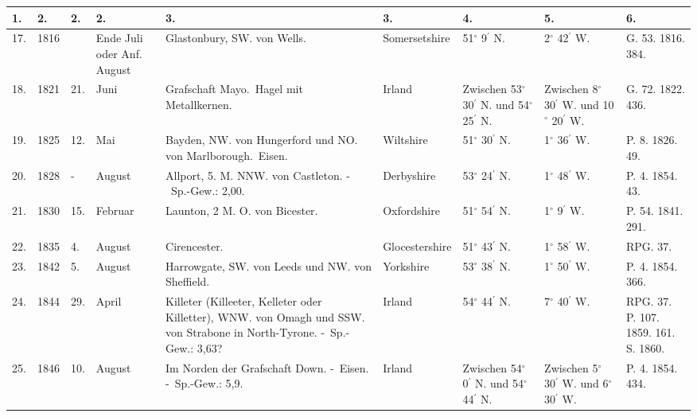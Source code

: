 \documentclass[a4paper, 11pt, oneside, polutonikogreek, german]{article}
\begin{document}
\clearpage
\begin{landscape}
\begin{table}[!ht]
    \centering
    \footnotesize
    \begin{tabular}{|p{5mm}|p{9mm}|p{5mm}|p{15mm}|p{48mm}|p{25mm}|p{12mm}|p{12mm}|p{11mm}|}
    \hline
        1. & 2. & 2. & 2. & 3. & 3. & 4. & 5. & 6. \\ \hline
        17. & 1816 & ~ & Ende Juli oder Anf. August & Glastonbury, SW. von Wells. & Somersetshire & 51$^\circ$ 9$^\prime$ N. & 2$^\circ$ 42$^\prime$ W. & G. 53. 1816. 384. \\ \hline        
        18. & 1821 & 21. & Juni & Grafschaft Mayo. Hagel mit Metallkernen. & Irland & Zwischen 53$^\circ$ 30$^\prime$ N. und 54$^\circ$ 25$^\prime$ N. & Zwischen 8$^\circ$ 30$^\prime$ W. und 10$^\circ$ 20$^\prime$ W. & G. 72. 1822. 436. \\ \hline
        19. & 1825 & 12. & Mai & Bayden, NW. von Hungerford und NO. von Marlborough. Eisen. & Wiltshire & 51$^\circ$ 30$^\prime$ N. & 1$^\circ$ 36$^\prime$ W. & P. 8. 1826. 49. \\ \hline
        20. & 1828 & - & August & Allport, 5. M. NNW. von Castleton. - Sp.-Gew.: 2,00. & Derbyshire & 53$^\circ$ 24$^\prime$ N. & 1$^\circ$ 48$^\prime$ W. & P. 4. 1854. 43. \\ \hline
        21. & 1830 & 15. & Februar & Launton, 2 M. O. von Bicester. & Oxfordshire & 51$^\circ$ 54$^\prime$ N. & 1$^\circ$ 9$^\prime$ W. & P. 54. 1841. 291. \\ \hline
        22. & 1835 & 4. & August & Cirencester. & Glocestershire & 51$^\circ$ 43$^\prime$ N. & 1$^\circ$ 58$^\prime$ W. & RPG. 37. \\ \hline
        23. & 1842 & 5. & August & Harrowgate, SW. von Leeds und NW. von Sheffield. & Yorkshire & 53$^\circ$ 38$^\prime$ N. & 1$^\circ$ 50$^\prime$ W. & P. 4. 1854. 366. \\ \hline
        24. & 1844 & 29. & April & Killeter (Killeeter, Kelleter oder Killetter), WNW. von Omagh und SSW. von Strabone in North-Tyrone. - Sp.-Gew.: 3,63? & Irland & 54$^\circ$ 44$^\prime$ N. & 7$^\circ$ 40$^\prime$ W. & RPG. 37. P. 107. 1859. 161. S. 1860. \\ \hline
        25. & 1846 & 10. & August & Im Norden der Grafschaft Down. - Eisen. - Sp.-Gew.: 5,9. & Irland & Zwischen 54$^\circ$ 0$^\prime$ N. und 54$^\circ$ 44$^\prime$ N. & Zwischen 5$^\circ$ 30$^\prime$ W. und 6$^\circ$ 30$^\prime$ W. & P. 4. 1854. 434. \\ \hline
    \end{tabular}
\end{table}
\end{landscape}
\end{document}
